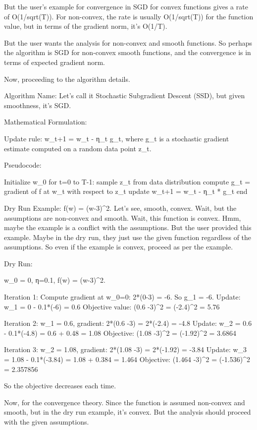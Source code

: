 But the user's example for convergence in SGD for convex functions gives a rate of O(1/sqrt(T)). For non-convex, the rate is usually O(1/sqrt(T)) for the function value, but in terms of the gradient norm, it's O(1/T).

But the user wants the analysis for non-convex and smooth functions. So perhaps the algorithm is SGD for non-convex smooth functions, and the convergence is in terms of expected gradient norm.

Now, proceeding to the algorithm details.

Algorithm Name: Let's call it Stochastic Subgradient Descent (SSD), but given smoothness, it's SGD.

Mathematical Formulation:

Update rule: w_{t+1} = w_t - η_t \cdot g_t, where g_t is a stochastic gradient estimate computed on a random data point z_t.

Pseudocode:

Initialize w_0
for t=0 to T-1:
    sample z_t from data distribution
    compute g_t = gradient of f at w_t with respect to z_t
    update w_{t+1} = w_t - η_t * g_t
end

Dry Run Example: f(w) = (w-3)^2. Let's see, smooth, convex. Wait, but the assumptions are non-convex and smooth. Wait, this function is convex. Hmm, maybe the example is a conflict with the assumptions. But the user provided this example. Maybe in the dry run, they just use the given function regardless of the assumptions. So even if the example is convex, proceed as per the example.

Dry Run:

w_0 = 0, η=0.1, f(w) = (w-3)^2.

Iteration 1:
Compute gradient at w_0=0: 2*(0-3) = -6. So g_1 = -6.
Update: w_1 = 0 - 0.1*(-6) = 0.6
Objective value: (0.6 -3)^2 = (-2.4)^2 = 5.76

Iteration 2:
w_1 = 0.6, gradient: 2*(0.6 -3) = 2*(-2.4) = -4.8
Update: w_2 = 0.6 - 0.1*(-4.8) = 0.6 + 0.48 = 1.08
Objective: (1.08 -3)^2 = (-1.92)^2 = 3.6864

Iteration 3:
w_2 = 1.08, gradient: 2*(1.08 -3) = 2*(-1.92) = -3.84
Update: w_3 = 1.08 - 0.1*(-3.84) = 1.08 + 0.384 = 1.464
Objective: (1.464 -3)^2 = (-1.536)^2 = 2.357856

So the objective decreases each time.

Now, for the convergence theory. Since the function is assumed non-convex and smooth, but in the dry run example, it's convex. But the analysis should proceed with the given assumptions.

